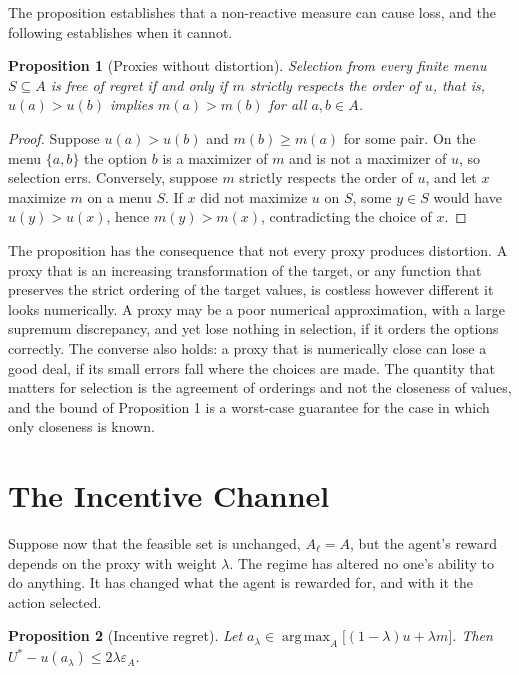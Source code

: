\documentclass[11pt]{article}
\newtheorem{proposition}{Proposition}
\theoremstyle{remark}
\newcommand{\argmax}{\operatorname*{arg\,max}}
\begin{document}
The proposition establishes that a non-reactive measure can cause loss, and the following establishes when it cannot.

\begin{proposition}[Proxies without distortion]
Selection from every finite menu $S\subseteq A$ is free of regret if and only if $m$ strictly respects the order of $u$, that is, $u(a)>u(b)$ implies $m(a)>m(b)$ for all $a,b\in A$.
\end{proposition}

\begin{proof}
Suppose $u(a)>u(b)$ and $m(b)\ge m(a)$ for some pair. On the menu $\{a,b\}$ the option $b$ is a maximizer of $m$ and is not a maximizer of $u$, so selection errs. Conversely, suppose $m$ strictly respects the order of $u$, and let $x$ maximize $m$ on a menu $S$. If $x$ did not maximize $u$ on $S$, some $y\in S$ would have $u(y)>u(x)$, hence $m(y)>m(x)$, contradicting the choice of $x$.
\end{proof}

The proposition has the consequence that not every proxy produces distortion. A proxy that is an increasing transformation of the target, or any function that preserves the strict ordering of the target values, is costless however different it looks numerically. A proxy may be a poor numerical approximation, with a large supremum discrepancy, and yet lose nothing in selection, if it orders the options correctly. The converse also holds: a proxy that is numerically close can lose a good deal, if its small errors fall where the choices are made. The quantity that matters for selection is the agreement of orderings and not the closeness of values, and the bound of Proposition 1 is a worst-case guarantee for the case in which only closeness is known.

\section{The Incentive Channel}

Suppose now that the feasible set is unchanged, $A_\ell=A$, but the agent's reward depends on the proxy with weight $\lambda$. The regime has altered no one's ability to do anything. It has changed what the agent is rewarded for, and with it the action selected.

\begin{proposition}[Incentive regret]
Let $a_\lambda\in\argmax_A\bigl[(1-\lambda)u+\lambda m\bigr]$. Then $U^\ast-u(a_\lambda)\le2\lambda\varepsilon_A$.
\end{proposition}
\end{document}
